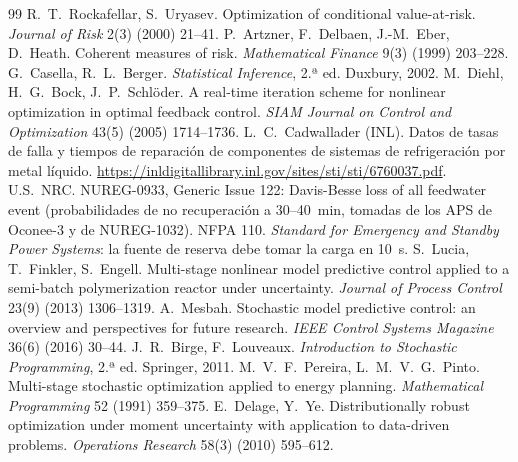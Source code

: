 \documentclass[11pt,a4paper]{article}
\theoremstyle{plain}
\theoremstyle{definition}
\begin{document}
\begin{thebibliography}{99}
 R.~T.~Rockafellar, S.~Uryasev. Optimization of conditional
  value-at-risk. \emph{Journal of Risk} 2(3) (2000) 21--41.
 P.~Artzner, F.~Delbaen, J.-M.~Eber, D.~Heath. Coherent measures of risk.
  \emph{Mathematical Finance} 9(3) (1999) 203--228.
 G.~Casella, R.~L.~Berger. \emph{Statistical Inference}, 2.ª ed.
  Duxbury, 2002.
 M.~Diehl, H.~G.~Bock, J.~P.~Schlöder. A real-time iteration scheme for
  nonlinear optimization in optimal feedback control. \emph{SIAM Journal on Control and
  Optimization} 43(5) (2005) 1714--1736.
 L.~C.~Cadwallader (INL). Datos de tasas de falla y tiempos de reparación
  de componentes de sistemas de refrigeración por metal líquido.
  \url{https://inldigitallibrary.inl.gov/sites/sti/sti/6760037.pdf}.
 U.S.~NRC. NUREG-0933, Generic Issue 122: Davis-Besse loss of all feedwater
  event (probabilidades de no recuperación a 30--40~min, tomadas de los APS de Oconee-3 y de
  NUREG-1032).
 NFPA 110. \emph{Standard for Emergency and Standby Power Systems}: la fuente
  de reserva debe tomar la carga en 10~s.
 S.~Lucia, T.~Finkler, S.~Engell. Multi-stage nonlinear model predictive
  control applied to a semi-batch polymerization reactor under uncertainty. \emph{Journal of
  Process Control} 23(9) (2013) 1306--1319.
 A.~Mesbah. Stochastic model predictive control: an overview and perspectives
  for future research. \emph{IEEE Control Systems Magazine} 36(6) (2016) 30--44.
 J.~R.~Birge, F.~Louveaux. \emph{Introduction to Stochastic Programming},
  2.ª ed. Springer, 2011.
 M.~V.~F.~Pereira, L.~M.~V.~G.~Pinto. Multi-stage stochastic optimization
  applied to energy planning. \emph{Mathematical Programming} 52 (1991) 359--375.
 E.~Delage, Y.~Ye. Distributionally robust optimization under moment
  uncertainty with application to data-driven problems. \emph{Operations Research} 58(3) (2010)
  595--612.
\end{thebibliography}
\end{document}
